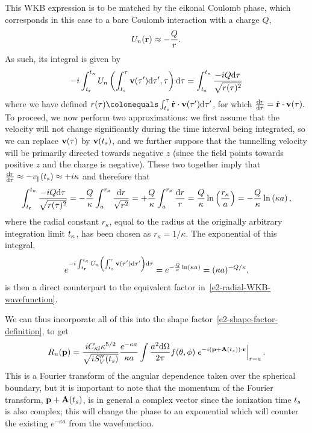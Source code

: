 This WKB expression is to be matched by the eikonal Coulomb phase, which corresponds in this case to a bare Coulomb interaction with a charge $Q$,
\begin{equation}
U_n(\vb{r})\approx -\frac{Q}{r}.
\end{equation}
As such, its integral is given by 
\begin{align}
-i\int_{{t_{\vb{r}}}}^{{t_\kappa}}U_n\left(\int_{ {t_s}}^\tau \vb{v}(\tau')\mathrm{d}\tau',\tau\right) \mathrm{d}\tau = \int_{t_a}^{{t_\kappa}} \frac{-iQ\mathrm{d}\tau}{\sqrt{r(\tau)^2}}
\label{e2-WKB-integral-coulomb}
\end{align}
where we have defined $r(\tau)\colonequals \int_{ \ts}^\tau \hat{\vbr}\cdot\vb{v}(\tau')\d\tau'$, for which $\frac{\mathrm{d} r}{\mathrm{d}\tau}=\hat{\vb{r}}\cdot \vb{v}(\tau).$ To proceed, we now perform two approximations: we first assume that the velocity will not change significantly during the time interval being integrated, so we can replace $\vb{v}(\tau)$ by $\vb{v}({t_s})$, and we further suppose that the tunnelling velocity will be primarily directed towards negative $z$ (since the field points towards positive $z$ and the charge is negative). These two together imply that $\frac{\mathrm{d} r}{\mathrm{d}\tau}\approx-v_\parallel({t_s})\approx+i\kappa$ and therefore that
\begin{align}
\int_{{t_{\vb{r}}}}^{{t_\kappa}} \frac{-iQ\mathrm{d}\tau}{\sqrt{r(\tau)^2}}
=
-\frac{Q}{\kappa}\int_{a}^{r_\kappa} \frac{\mathrm{d} r}{\sqrt{r^2}}
=
+\frac{Q}{\kappa}\int_{a}^{r_\kappa} \frac{\mathrm{d} r}{r}
=
\frac{Q}{\kappa}\ln\left(\frac{r_\kappa}{a}\right)
=
-\frac{Q}{\kappa}\ln\left(\kappa a\right),
\end{align}
where the radial constant $r_\kappa$, equal to the radius at the originally arbitrary integration limit ${t_\kappa}$, has been chosen as $r_\kappa=1/\kappa$. The exponential of this integral, 
\begin{equation}
e^{
-i\int_{{t_{\vb{r}}}}^{{t_\kappa}}U_n\left(\int_{ {t_s}}^\tau \vb{v}(\tau')\mathrm{d}\tau'\right) \mathrm{d}\tau 
}
=
e^{
-\frac{Q}{\kappa}\ln\left(\kappa a\right)
}
=(\kappa a)^{-Q/\kappa},
\end{equation}
is then a direct counterpart to the equivalent factor in~\eqref{e2-radial-WKB-wavefunction}.

We can thus incorporate all of this into the shape factor~\eqref{e2-shape-factor-definition}, to get 
\begin{equation}
R_n(\vb{p})
=
\frac{ iC_{\kappa l} \kappa^{5/2} }{\sqrt{iS_V''({t_s})}}
\frac{e^{-\kappa a}}{\kappa a}
\int\frac{a^2\mathrm{d}\Omega}{2\pi}
f(\theta,\phi)
\left. e^{-i\left(\vb{p}+\vb{A}({t_s})\right)\cdot\vb{r}} \right|_{r=a}
. 
\label{e2-shape-factor-first-stab}
\end{equation}
This is a Fourier transform of the angular dependence taken over the spherical boundary, but it is important to note that the momentum of the Fourier transform, $\vb{p}+\vb{A}({t_s})$, is in general a complex vector since the ionization time ${t_s}$ is also complex; this will change the phase to an exponential which will counter the existing $e^{-\kappa a}$ from the wavefunction.

